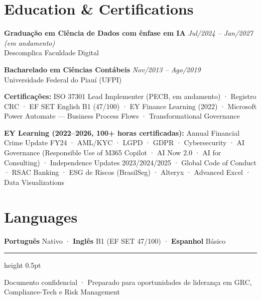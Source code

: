 \documentclass[10pt, a4paper]{article}
\begin{document}
\section*{Education \& Certifications}

\textbf{Graduação em Ciência de Dados com ênfase em IA} \hfill {\itshape Jul/2024 – Jan/2027 (em andamento)}\\
{\small Descomplica Faculdade Digital}

\textbf{Bacharelado em Ciências Contábeis} \hfill {\itshape Nov/2013 – Ago/2019}\\
{\small Universidade Federal do Piauí (UFPI)}

\vspace{0.5em}

\textbf{Certificações:} ISO 37301 Lead Implementer (PECB, em andamento) · Registro CRC · EF SET English B1 (47/100) · EY Finance Learning (2022) · Microsoft Power Automate — Business Process Flows · Transformational Governance

\vspace{0.5em}

\textbf{EY Learning (2022–2026, 100+ horas certificadas):} Annual Financial Crime Update FY24 · AML/KYC · LGPD · GDPR · Cybersecurity · AI Governance (Responsible Use of M365 Copilot · AI Now 2.0 · AI for Consulting) · Independence Updates 2023/2024/2025 · Global Code of Conduct · RSAC Banking · ESG de Riscos (BrasilSeg) · Alteryx · Advanced Excel · Data Visualizations

\vspace{0.8em}

\section*{Languages}

\textbf{Português} Nativo · \textbf{Inglês} B1 (EF SET 47/100) · \textbf{Espanhol} Básico

\vspace{1em}

\begin{center}
\textcolor{SubtleRule}{\hrule height 0.5pt}
\vspace{0.3em}
{\sffamily\fontsize{8pt}{10pt}\selectfont\color{GraphiteGrey}%
Documento confidencial · Preparado para oportunidades de liderança em GRC, Compliance-Tech e Risk Management}
\end{center}
\end{document}
